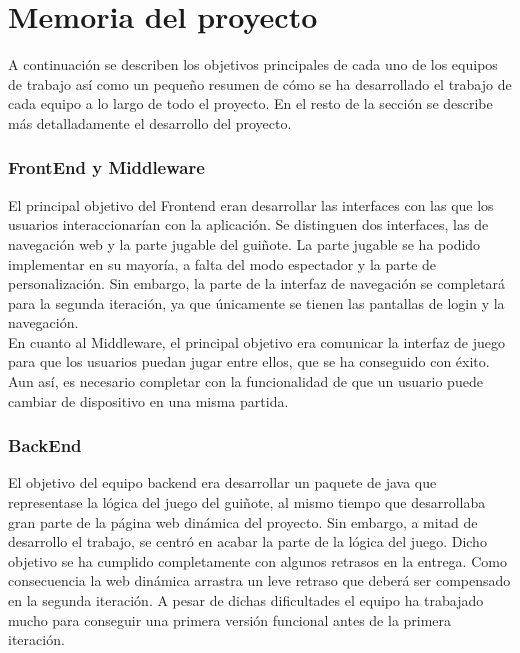\section{Memoria del proyecto}
\label{memoria}
A continuación se describen los objetivos principales de cada uno de los equipos de trabajo así como un pequeño resumen de cómo se ha desarrollado el trabajo de cada equipo a lo largo de todo el proyecto. En el resto de la sección se describe más detalladamente el desarrollo del proyecto.\\

\subsubsection*{FrontEnd y Middleware}
El principal objetivo del Frontend eran desarrollar las interfaces con las que los usuarios interaccionarían con la aplicación. Se distinguen dos interfaces, las de navegación web y la parte jugable del guiñote. La parte jugable se ha podido implementar en su mayoría, a falta del modo espectador y la parte de personalización. Sin embargo, la parte de la interfaz de navegación se completará para la segunda iteración, ya que únicamente se tienen las pantallas de login y la navegación.
\\
En cuanto al Middleware, el principal objetivo era comunicar la interfaz de juego para que los usuarios puedan jugar entre ellos, que se ha conseguido con éxito. Aun así, es necesario completar con la funcionalidad de que un usuario puede cambiar de dispositivo en una misma partida.

\subsubsection*{BackEnd}
El objetivo del equipo backend era desarrollar un paquete de java que representase la lógica del juego del guiñote, al mismo tiempo que desarrollaba gran parte de la página web dinámica del proyecto. Sin embargo, a mitad de desarrollo el trabajo, se centró en acabar la parte de la lógica del juego. Dicho objetivo se ha cumplido completamente con algunos retrasos en la entrega. Como consecuencia la web dinámica arrastra un leve retraso que deberá ser compensado en la segunda iteración. A pesar de dichas dificultades el equipo ha trabajado mucho para conseguir una primera versión funcional antes de la primera iteración.

